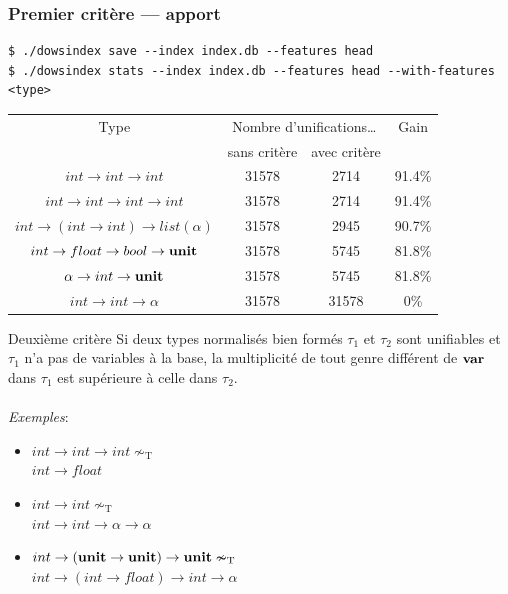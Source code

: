 \documentclass[serif]{beamer}
\newcommand{\exemples}{\textit{Exemples}\xspace}
\newcommand{\unit}{\bold{unit}}
\newcommand{\T}{\mathrm{T}}
\begin{document}

\begin{frame}[fragile=singleslide]\frametitle{Premier critère — apport}
\scriptsize
\begin{verbatim}
$ ./dowsindex save --index index.db --features head
$ ./dowsindex stats --index index.db --features head --with-features <type>
\end{verbatim}
\small
\begin{table}[h]
	\centering
	\begin{tabular}{|*{4}{c|}}
		\hline
			Type &
			\multicolumn{2}{c|}{Nombre d'unifications\dots} &
			Gain
		\\
		\cline{2-3}
      		&
			sans critère & avec critère &
		\\
		\hline
			$int \rightarrow int \rightarrow int$ &
			31578 & 2714 & 91.4\%
		\\
			$int \rightarrow int \rightarrow int \rightarrow int$ &
			31578 & 2714 & 91.4\%
		\\
			$int \rightarrow (int \rightarrow int) \rightarrow list (\alpha)$ &
			31578 & 2945 & 90.7\%
		\\
			$int \rightarrow float \rightarrow bool \rightarrow \bold{unit}$ &
			31578 & 5745 & 81.8\%
		\\
			$\alpha \rightarrow int \rightarrow \bold{unit}$ &
			31578 & 5745 & 81.8\%
		\\
			$int \rightarrow int \rightarrow \alpha$ &
			31578 & 31578 & 0\%
		\\
		\hline
	\end{tabular}
\end{table}
\end{frame}


\begin{frame}{Deuxième critère}
Si deux types normalisés bien formés $\tau_1$ et $\tau_2$ sont unifiables et $\tau_1$ n'a pas de variables à la base, la multiplicité de tout genre différent de $\bold{var}$ dans $\tau_1$ est supérieure à celle dans $\tau_2$.
\\~\\
\exemples :
\begin{itemize}
	\item
		$int \rightarrow int \rightarrow int \nsim_\T$ \\
		$int \rightarrow float$
	\item
		$int \rightarrow int \nsim_\T$ \\
		$int \rightarrow int \rightarrow \alpha \rightarrow \alpha$
	\item
		$int \rightarrow (\unit \rightarrow \unit) \rightarrow \unit \nsim_\T$ \\
		$int \rightarrow (int \rightarrow float) \rightarrow int \rightarrow \alpha$
\end{itemize}
\end{frame}
\end{document}
